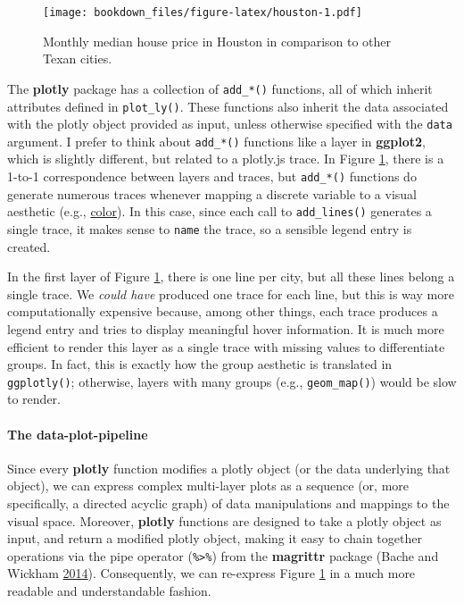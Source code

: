 \documentclass[12pt,]{isuthesis}
\let\oldparagraph\paragraph
\renewcommand{\paragraph}[1]{\oldparagraph{#1}\mbox{}}
\begin{document}
\begin{figure}
\centering
\texttt{[image: bookdown\_files/figure-latex/houston-1.pdf]}
\caption{\label{fig:houston}Monthly median house price in Houston in
comparison to other Texan cities.}
\end{figure}

The \textbf{plotly} package has a collection of \texttt{add\_*()}
functions, all of which inherit attributes defined in
\texttt{plot\_ly()}. These functions also inherit the data associated
with the plotly object provided as input, unless otherwise specified
with the \texttt{data} argument. I prefer to think about
\texttt{add\_*()} functions like a layer in \textbf{ggplot2}, which is
slightly different, but related to a plotly.js trace. In Figure
\ref{fig:houston}, there is a 1-to-1 correspondence between layers and
traces, but \texttt{add\_*()} functions do generate numerous traces
whenever mapping a discrete variable to a visual aesthetic (e.g.,
\href{scatterplots-discrete-color}{color}). In this case, since each
call to \texttt{add\_lines()} generates a single trace, it makes sense
to \texttt{name} the trace, so a sensible legend entry is created.

In the first layer of Figure \ref{fig:houston}, there is one line per
city, but all these lines belong a single trace. We \emph{could have}
produced one trace for each line, but this is way more computationally
expensive because, among other things, each trace produces a legend
entry and tries to display meaningful hover information. It is much more
efficient to render this layer as a single trace with missing values to
differentiate groups. In fact, this is exactly how the group aesthetic
is translated in \texttt{ggplotly()}; otherwise, layers with many groups
(e.g., \texttt{geom\_map()}) would be slow to render.

\hypertarget{the-data-plot-pipeline}{\paragraph{The
data-plot-pipeline}\label{the-data-plot-pipeline}}

Since every \textbf{plotly} function modifies a plotly object (or the
data underlying that object), we can express complex multi-layer plots
as a sequence (or, more specifically, a directed acyclic graph) of data
manipulations and mappings to the visual space. Moreover,
\textbf{plotly} functions are designed to take a plotly object as input,
and return a modified plotly object, making it easy to chain together
operations via the pipe operator (\texttt{\%\textgreater{}\%}) from the
\textbf{magrittr} package (Bache and Wickham
\protect\hyperlink{ref-magrittr}{2014}). Consequently, we can re-express
Figure \ref{fig:houston} in a much more readable and understandable
fashion.
\end{document}
